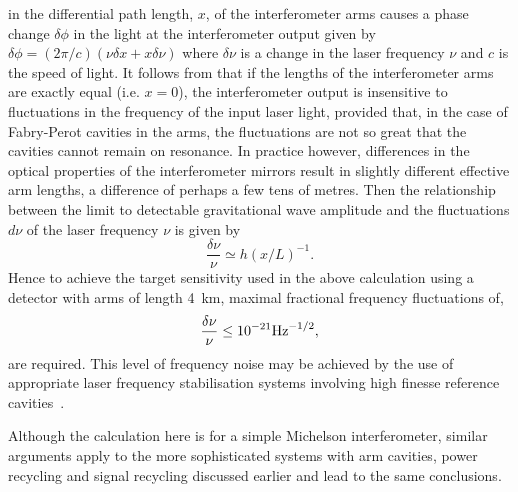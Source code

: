 \documentclass{article}
\begin{document}
\begin{itemize}
in the differential path length, $x$, of the interferometer arms causes a phase
change $\delta \phi$ in the light at the interferometer output given by $\delta
\phi = (2\pi/c) (\nu \delta x + x \delta\nu)$ where $\delta \nu$ is a change in
the laser frequency $\nu$ and $c$ is the speed of light. It follows from that if
the lengths of the interferometer arms are exactly equal (i.e. $x = 0$), the
interferometer output is insensitive to fluctuations in the frequency of the
input laser light, provided that, in the case of Fabry-Perot cavities in the
arms, the fluctuations are not so great that the cavities cannot remain on
resonance.  In practice however, differences in the optical properties of the
interferometer mirrors result in  slightly different effective arm lengths, a
difference of perhaps a few tens of metres. Then the relationship between
the limit to detectable gravitational wave amplitude and the fluctuations
$d\nu$ of the laser frequency $\nu$ is given by~\cite{Hough}
%
\begin{equation}
  \frac{\delta \nu}{\nu} \simeq h(x/L)^{-1}.
  \label{equation:frequnoise}
\end{equation}
%
Hence to achieve the target sensitivity used in the above calculation using a
detector with arms of length 4~km, maximal fractional frequency fluctuations of,
%
\begin{equation}
  \frac{\delta \nu}{\nu} \leq 10^{-21}{\rm Hz}^{-1/2},
  \label{equation:freqspecification}
\end{equation}
%
are required. This level of frequency noise may be achieved by the use of
appropriate laser frequency stabilisation systems involving high finesse
reference cavities~\cite{Hough}.

Although the calculation here is for a simple Michelson interferometer, similar
arguments apply to the more sophisticated systems with arm cavities, power
recycling and signal recycling discussed earlier and lead to the same
conclusions.


\end{itemize}
\end{document}
